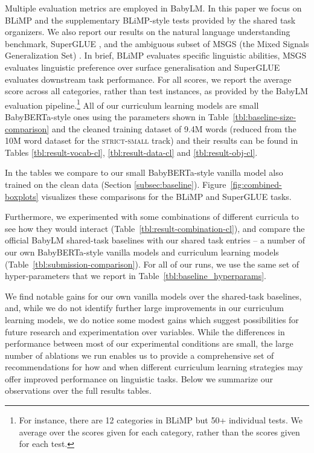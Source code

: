 Multiple evaluation metrics are employed in BabyLM. In this paper we focus on BLiMP \cite{warstadt2020blimp} and the supplementary BLiMP-style tests provided by the shared task organizers. We also report our results on the natural language understanding benchmark, SuperGLUE \cite{wang2019superglue}, and the ambiguous subset of MSGS (the Mixed Signals Generalization Set) \cite{warstadt2020msgs}. In brief, BLiMP evaluates specific linguistic abilities, MSGS evaluates linguistic preference over surface generalisation and SuperGLUE evaluates downstream task performance. For all scores, we report the average score across all categories, rather than test instances, as provided by the BabyLM evaluation pipeline.\footnote{For instance, there are 12 categories in BLiMP but 50+ individual tests. We average over the scores given for each category, rather than the scores given for each test.} All of our curriculum learning models are small BabyBERTa-style ones using the parameters shown in Table~\ref{tbl:baseline-size-comparison} and the cleaned training dataset of 9.4M words (reduced from the 10M word dataset for the \textsc{strict-small} track) and their results can be found in Tables \ref{tbl:result-vocab-cl}, \ref{tbl:result-data-cl} and \ref{tbl:result-obj-cl}. 


In the tables we compare to our small BabyBERTa-style vanilla model also trained on the clean data (Section \ref{subsec:baseline}). Figure~\ref{fig:combined-boxplots} visualizes these comparisons for the BLiMP and SuperGLUE tasks.

Furthermore, we experimented with some combinations of different curricula to see how they would interact (Table~\ref{tbl:result-combination-cl}), and compare the official BabyLM shared-task baselines with our shared task entries -- a number of our own BabyBERTa-style vanilla models and curriculum learning models (Table~\ref{tbl:submission-comparison}). For all of our runs, we use the same set of hyper-parameters that we report in Table~\ref{tbl:baseline_hyperparams}. 


We find notable gains for our own vanilla models over the shared-task baselines, and, while we do not identify further large improvements in our curriculum learning models, we do notice some modest gains which suggest possibilities for future research and experimentation over variables. While the differences in performance between most of our experimental conditions are small, the large number of ablations we run enables us to provide a comprehensive set of recommendations for how and when different curriculum learning strategies may offer improved performance on linguistic tasks. Below we summarize our observations over the full results tables.


